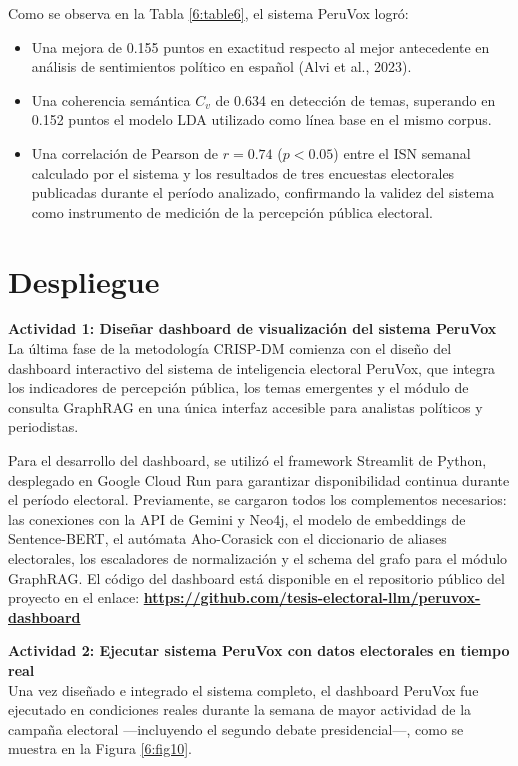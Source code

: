 Como se observa en la Tabla \ref{6:table6}, el sistema PeruVox logró:
\begin{itemize}
    \item Una mejora de 0.155 puntos en exactitud respecto al mejor antecedente en
    análisis de sentimientos político en español (Alvi et al., 2023).
    \item Una coherencia semántica $C_v$ de 0.634 en detección de temas, superando en
    0.152 puntos el modelo LDA utilizado como línea base en el mismo corpus.
    \item Una correlación de Pearson de $r = 0.74$ ($p < 0.05$) entre el ISN semanal
    calculado por el sistema y los resultados de tres encuestas electorales publicadas
    durante el período analizado, confirmando la validez del sistema como instrumento
    de medición de la percepción pública electoral.
\end{itemize}

\section{Despliegue}

\textbf{Actividad 1: Diseñar dashboard de visualización del sistema PeruVox}
\\
La última fase de la metodología CRISP-DM comienza con el diseño del dashboard
interactivo del sistema de inteligencia electoral PeruVox, que integra los indicadores
de percepción pública, los temas emergentes y el módulo de consulta GraphRAG en
una única interfaz accesible para analistas políticos y periodistas.

Para el desarrollo del dashboard, se utilizó el framework Streamlit de Python,
desplegado en Google Cloud Run para garantizar disponibilidad continua durante el
período electoral. Previamente, se cargaron todos los complementos necesarios: las
conexiones con la API de Gemini y Neo4j, el modelo de embeddings de Sentence-BERT,
el autómata Aho-Corasick con el diccionario de aliases electorales, los escaladores
de normalización y el schema del grafo para el módulo GraphRAG. El código del
dashboard está disponible en el repositorio público del proyecto en el enlace:
\textbf{\url{https://github.com/tesis-electoral-llm/peruvox-dashboard}}

\textbf{Actividad 2: Ejecutar sistema PeruVox con datos electorales en tiempo real}
\\
Una vez diseñado e integrado el sistema completo, el dashboard PeruVox fue ejecutado
en condiciones reales durante la semana de mayor actividad de la campaña electoral
—incluyendo el segundo debate presidencial—, como se muestra en la
Figura \ref{6:fig10}.

